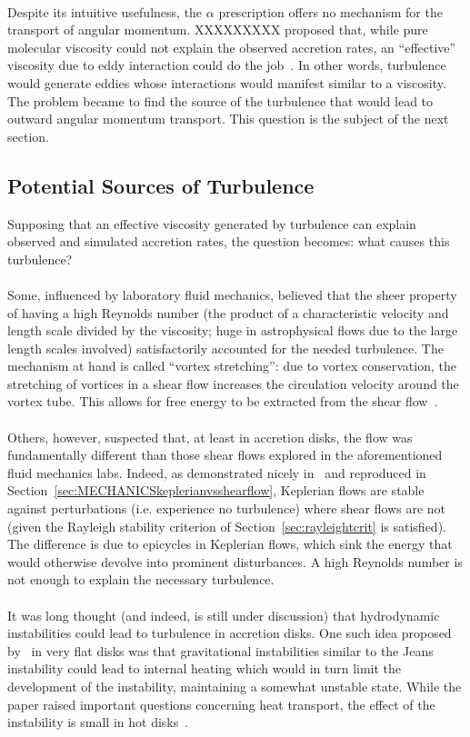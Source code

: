 \\
Despite its intuitive usefulness, the $\alpha$ prescription offers no mechanism for the transport of angular momentum. XXXXXXXXX proposed that, while pure molecular viscosity could not explain the observed accretion rates, an ``effective'' viscosity due to eddy interaction could do the job~\cite{XXXXXX}. In other words, turbulence would generate eddies whose interactions would manifest similar to a viscosity. The problem became to find the source of the turbulence that would lead to outward angular momentum transport. This question is the subject of the next section.

\subsection{Potential Sources of Turbulence}
Supposing that an effective viscosity generated by turbulence can explain observed and simulated accretion rates, the question becomes: what causes this turbulence? \\
\\
Some, influenced by laboratory fluid mechanics, believed that the sheer property of having a high Reynolds number (the product of a characteristic velocity and length scale divided by the viscosity; huge in astrophysical flows due to the large length scales involved) satisfactorily accounted for the needed turbulence. The mechanism at hand is called ``vortex stretching'': due to vortex conservation, the stretching of vortices in a shear flow increases the circulation velocity around the vortex tube. This allows for free energy to be extracted from the shear flow~\cite{BH1998}.\\
\\
Others, however, suspected that, at least in accretion disks, the flow was fundamentally different than those shear flows explored in the aforementioned fluid mechanics labs. Indeed, as demonstrated nicely in~\cite{BH1998:SectionIII.c.1} and reproduced in Section~\ref{sec:MECHANICSkeplerianvsshearflow}, Keplerian flows are stable against perturbations (i.e. experience no turbulence) where shear flows are not (given the Rayleigh stability criterion of Section~\ref{sec:rayleightcrit} is satisfied). The difference is due to epicycles in Keplerian flows, which sink the energy that would otherwise devolve into prominent disturbances. A high Reynolds number is not enough to explain the necessary turbulence.\\
\\
It was long thought (and indeed, is still under discussion) that hydrodynamic instabilities could lead to turbulence in accretion disks. One such idea proposed by~\citet{Paczynski1978} in very flat disks was that gravitational instabilities similar to the Jeans instability could lead to internal heating which would in turn limit the development of the instability, maintaining a somewhat unstable state. While the paper raised important questions concerning heat transport, the effect of the instability is small in hot disks~\cite{Spruit2009}.\\
